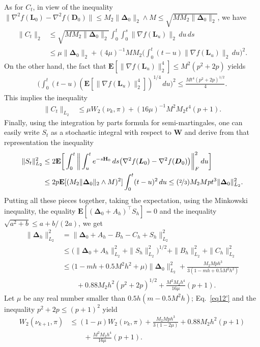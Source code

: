 \documentclass[aoap,preprint,reqno,a4paper]{imsart} %
\newcommand{\bDelta}{\boldsymbol{\Delta}}
\newcommand{\bfE}{\mathbf E}
\newcommand{\bfH}{\mathbf H}
\newcommand{\bW}{\boldsymbol W\!}
\newcommand{\bD}{\boldsymbol D}
\newcommand{\bL}{\boldsymbol L}
\begin{document}
As for $C_t$, in view of the inequality $\|\nabla^2 f(\bL_0)-\nabla^2 f(\bD_0)\|\le
M_2\|\bDelta_0\|_2\wedge M\le \sqrt{MM_2\|\bDelta_0\|_2}$, we have
\begin{align}
\|C_t\|_2
		&\le \sqrt{MM_2\|\bDelta_0\|_2}\int_0^t \int_0^s\|\nabla f(\bL_u)\|_2\,du\,ds\\
		&\le \mu\|\bDelta_0\|_2 + (4\mu)^{-1}MM_2\bigg(\int_0^t (t-u)\|\nabla f(\bL_u)\|_2\,du\bigg)^2.
\end{align}
On the other hand, the fact that $\bfE[\|\nabla f(\bL_u)\|_2^4]\le M^2(p^2+2p)$ yields
\begin{align}\label{eq15}
\bigg(\int_0^t (t-u)(\bfE[\|\nabla f(\bL_u)\|_2^4])^{1/4}\,du\bigg)^2 \le \frac{Mt^4(p^2+2p)^{1/2}}{4}.
\end{align}
This implies the inequality
\begin{align}
\|C_t\|_{L_2}
		&\le \mu W_2(\nu_k,\pi) + (16\mu)^{-1}M^2M_2t^4(p+1). \label{Ct}
\end{align}
Finally, using the integration by parts formula for semi-martingales, one can easily write $S_t$
as a stochastic integral with respect to $\bW$ and derive from that representation the inequality
\begin{align}
\|S_t\|_{L_2}^2
		&\le 2\bfE\bigg[\int_0^t \bigg\|\int_u^te^{-s\bfH_0}\,ds\big(\nabla^2 f(\bL_0)-\nabla^2 f(\bD_0)\big)\bigg\|_F^2\,du\bigg]\\
		&\le 2p\bfE[(M_2\|\bDelta_0\|_2\wedge M)^2] \int_0^t (t-u)^2\,du \le (\nicefrac23)M_2Mpt^3\|\bDelta_0\|_{L_2}^2.
		\label{St}
\end{align}
Putting all these pieces together, taking the expectation, using the Minkowski inequality,
the equality $\bfE[(\bDelta_0+A_h)^\top S_h]=0$ and the inequality $\sqrt{a^2+b}\le a+b/(2a)$,  we get
\begin{align}
\|\bDelta_h\|_{L_2}^2
		&= \|\bDelta_0 +A_h-B_h-C_h+S_h\|_{L_2}^2\\
		&\le \big(\|\bDelta_0+A_h\|_{L_2}^2+\|S_h\|_{L_2}^2\big)^{1/2}+\|B_h\|_{L_2}^2+\|C_h\|_{L_2}^2\\
		&\le \big(1-mh + 0.5M^2h^2+\mu\big)\|\bDelta_0\|_{L_2}^2+ \frac{M_2Mph^3}{3(1-mh + 0.5M^2h^2)}\\
		&\qquad + 0.88 M_2h^2(p^2+2p)^{1/2} + \frac{M^2M_2h^4}{16\mu}(p+1).\label{eq12'}
\end{align}
Let $\mu$ be any real number smaller than $0.5h(m - 0.5M^2h)$;
Eq.\ \eqref{eq12'} and the inequality $p^2+2p\le (p+1)^2$ yield
\begin{align}
W_2(\nu_{k+1},\pi)
		&\le (1 - \mu)W_2(\nu_{k},\pi)+ \frac{M_2Mph^3}{3(1-2\mu)}+ 0.88 M_2h^2(p+1) \\
		&\qquad + \frac{M^2M_2h^4}{16\mu}(p+1).\label{eq13'}
\end{align}
\end{document}
